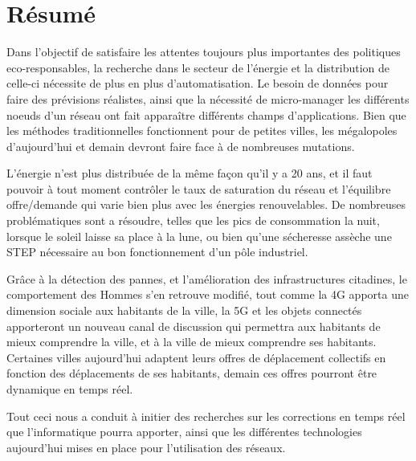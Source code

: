 \chapter*{Résumé}

Dans l'objectif de satisfaire les attentes toujours plus importantes des politiques eco-responsables,
la recherche dans le secteur de l'énergie et la distribution de celle-ci nécessite de plus en plus d'automatisation.
Le besoin de données pour faire des prévisions réalistes, ainsi que la nécessité de micro-manager les différents noeuds
d'un réseau ont fait apparaître différents champs d'applications. Bien que les méthodes traditionnelles fonctionnent
pour de petites villes, les mégalopoles d'aujourd'hui et demain devront faire face à de nombreuses mutations.

L'énergie n'est plus distribuée de la même façon qu'il y a 20 ans, et il faut pouvoir à tout moment contrôler
le taux de saturation du réseau et l'équilibre offre/demande qui varie bien plus avec les énergies renouvelables.
De nombreuses problématiques sont a résoudre, telles que les pics de consommation la nuit, lorsque le soleil laisse sa place
à la lune, ou bien qu'une sécheresse assèche une STEP nécessaire au bon fonctionnement d'un pôle industriel.

Grâce à la détection des pannes, et l'amélioration des infrastructures citadines, le comportement des Hommes
s'en retrouve modifié, tout comme la 4G apporta une dimension sociale aux habitants de la ville, la 5G et les objets
connectés apporteront un nouveau canal de discussion qui permettra aux habitants de mieux comprendre la ville, et
à la ville de mieux comprendre ses habitants. Certaines villes aujourd'hui adaptent leurs offres de déplacement
collectifs en fonction des déplacements de ses habitants, demain ces offres pourront être dynamique en temps réel.

Tout ceci nous a conduit à initier des recherches sur les corrections en temps réel que l'informatique pourra
apporter, ainsi que les différentes technologies aujourd'hui mises en place pour l'utilisation des réseaux.
